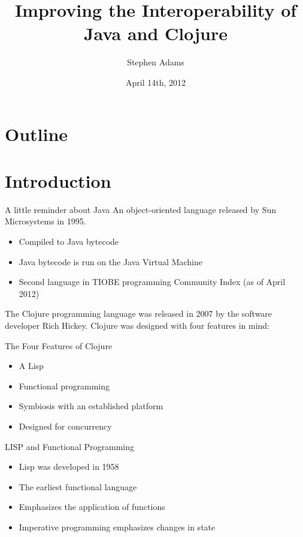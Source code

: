 \documentclass[xcolor=dvipsnames]{beamer}
\title{Improving the Interoperability of Java and Clojure}
\author{Stephen Adams}
\institute{University of Minnesota: Morris}
\date{April 14th, 2012}
\begin{document}
\begin{frame}
	\titlepage
\end{frame}

\section*{Outline}
	\section{Introduction}
	
	\begin{frame}{A little reminder about Java}
		An object-oriented language released by Sun Microsystems in 1995.
		\begin{itemize}
		\item Compiled to Java bytecode
		\item Java bytecode is run on the Java Virtual Machine
		\item Second language in TIOBE programming Community Index (as of April 2012)
		\end{itemize}
	\end{frame}
		
	\begin{frame}
		The Clojure programming language was released in 2007 by the software developer Rich Hickey. Clojure was designed with four features in mind:
		\pause
		\begin{block}{The Four Features of Clojure}
		\begin{itemize}
			\item A Lisp
			\item Functional programming
			\item Symbiosis with an established platform
			\item Designed for concurrency
		\end{itemize}
		\end{block}
	\end{frame}
	
	\begin{frame}{LISP and Functional Programming}
		\begin{itemize}
		\item Lisp was developed in 1958
		\item The earliest functional language
		\item Emphasizes the application of functions
		\item Imperative programming emphasizes changes in state
		\end{itemize}
	\end{frame}
	
\end{document}

